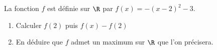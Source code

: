 
La fonction $f$ est définie sur $\R$ par $f(x)=-(x-2)^2-3$.
\begin{enumerate}
\item Calculer $f(2)$ puis $f(x)-f(2)$
\item En déduire que $f$ admet un maximum sur $\R$ que l'on précisera. 
\end{enumerate}